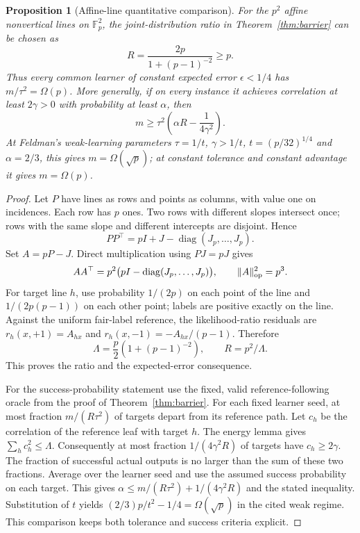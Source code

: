 \documentclass[11pt]{article}
\newtheorem{proposition}[theorem]{Proposition}
\newcommand{\1}{\mathbf 1}
\begin{document}
\begin{samepage}
\begin{proposition}[Affine-line quantitative comparison]\label{prop:affine}
For the $p^2$ affine nonvertical lines on $\mathbb F_p^2$, the joint-distribution ratio in Theorem~\ref{thm:barrier} can be chosen as
\[
 R=\frac{2p}{1+(p-1)^{-2}}\ge p.
\]
Thus every common learner of constant expected error $\epsilon<1/4$ has $m/\tau^2=\Omega(p)$. More generally, if on every instance it achieves correlation at least $2\gamma>0$ with probability at least $\alpha$, then
\[
 m\ge\tau^2\left(\alpha R-\frac1{4\gamma^2}\right).
\]
At Feldman's weak-learning parameters $\tau=1/t$, $\gamma>1/t$, $t=(p/32)^{1/4}$ and $\alpha=2/3$, this gives $m=\Omega(\sqrt p)$; at constant tolerance and constant advantage it gives $m=\Omega(p)$.
\end{proposition}
\end{samepage}
\begin{proof}
Let $P$ have lines as rows and points as columns, with value one on incidences. Each row has $p$ ones. Two rows with different slopes intersect once; rows with the same slope and different intercepts are disjoint. Hence
\[
 PP^\top=pI+J-\operatorname{diag}(J_p,\ldots,J_p).
\]
Set $A=pP-J$. Direct multiplication using $PJ=pJ$ gives
\[
 AA^\top=p^2\bigl(pI-\operatorname{diag}(J_p,\ldots,J_p)\bigr),
 \qquad \|A\|_{\rm op}^2=p^3.
\]
For target line $h$, use probability $1/(2p)$ on each point of the line and $1/(2p(p-1))$ on each other point; labels are positive exactly on the line. Against the uniform fair-label reference, the likelihood-ratio residuals are $r_h(x,+1)=A_{hx}$ and $r_h(x,-1)=-A_{hx}/(p-1)$. Therefore
\[
 \Lambda=\frac p2(1+(p-1)^{-2}),\qquad R=p^2/\Lambda.
\]
This proves the ratio and the expected-error consequence.

For the success-probability statement use the fixed, valid reference-following oracle from the proof of Theorem~\ref{thm:barrier}. For each fixed learner seed, at most fraction $m/(R\tau^2)$ of targets depart from its reference path. Let $c_h$ be the correlation of the reference leaf with target $h$. The energy lemma gives $\sum_hc_h^2\le\Lambda$. Consequently at most fraction $1/(4\gamma^2R)$ of targets have $c_h\ge2\gamma$. The fraction of successful actual outputs is no larger than the sum of these two fractions. Average over the learner seed and use the assumed success probability on each target. This gives $\alpha\le m/(R\tau^2)+1/(4\gamma^2R)$ and the stated inequality. Substitution of $t$ yields $(2/3)p/t^2-1/4=\Omega(\sqrt p)$ in the cited weak regime. This comparison keeps both tolerance and success criteria explicit.
\end{proof}
\end{document}
